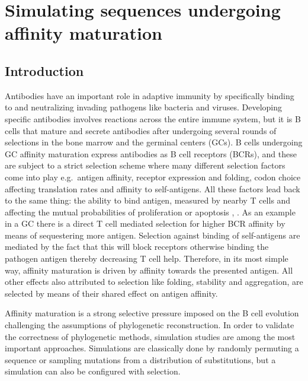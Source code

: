 \chapter{Simulating sequences undergoing affinity maturation}

\section{Introduction}
Antibodies have an important role in adaptive immunity by specifically binding to and neutralizing invading pathogens like bacteria and viruses.
Developing specific antibodies involves reactions across the entire immune system, but it is B cells that mature and secrete antibodies after undergoing several rounds of selections in the bone marrow and the germinal centers (GCs).
B cells undergoing GC affinity maturation express antibodies as B cell receptors (BCRs), and these are subject to a strict selection scheme where many different selection factors come into play e.g.\ antigen affinity, receptor expression and folding, codon choice affecting translation rates and affinity to self-antigens.
All these factors lead back to the same thing: the ability to bind antigen, measured by nearby T cells and affecting the mutual probabilities of proliferation or apoptosis \cite{Bannard_Cyster_2017}, \cite{victora2012germinal}.
As an example in a GC there is a direct T cell mediated selection for higher BCR affinity by means of sequestering more antigen.
Selection against binding of self-antigens are mediated by the fact that this will block receptors otherwise binding the pathogen antigen thereby decreasing T cell help.
Therefore, in its most simple way, affinity maturation is driven by affinity towards the presented antigen.
All other effects also attributed to selection like folding, stability and aggregation, are selected by means of their shared effect on antigen affinity.

Affinity maturation is a strong selective pressure imposed on the B cell evolution challenging the assumptions of phylogenetic reconstruction.
In order to validate the correctness of phylogenetic methods, simulation studies are among the most important approaches.
Simulations are classically done by randomly permuting a sequence or sampling mutations from a distribution of substitutions, but a simulation can also be configured with selection.


